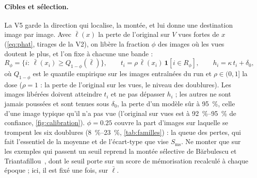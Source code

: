 \documentclass[11pt,a4paper]{article}
\begin{document}
\paragraph{Cibles et sélection.} La V5 garde la direction qui localise, la montée, et lui donne une
destination image par image. Avec $\bar\ell(x)$ la perte de l'original sur $V$ vues fortes de $x$
(\cref{eq:phat}, tirages de la V2), on libère la fraction $\phi$ des images où les vues doutent le
plus, et l'on fixe à chacune une bande :
\begin{equation}\label{eq:v5targets}
  R_\phi=\bigl\{i:\ \bar\ell(x_i)\ge Q_{1-\phi}(\bar\ell)\bigr\},\qquad
  t_i=\rho\,\bar\ell(x_i)\,\mathbf 1[i\in R_\phi],\qquad
  h_i=\kappa\,t_i+\delta_0,
\end{equation}
où $Q_{1-\phi}$ est le quantile empirique sur les images entraînées du run et $\rho\in(0,1]$ la dose
($\rho=1$ : la perte de l'original sur les vues, le niveau des doublures). Les images libérées doivent
atteindre $t_i$ et ne pas dépasser $h_i$ ; les autres ne sont jamais poussées et sont tenues sous
$\delta_0$, la perte d'un modèle sûr à \SI{95}{\percent}, celle d'une image typique qu'il n'a pas vue
(l'original sur vues est à \SIrange{92}{95}{\percent} de confiance, \cref{fig:calibration}).
$\phi=\num{0.25}$ couvre la part d'images sur laquelle se trompent les six doublures
(\SIrange{8}{23}{\percent}, \cref{tab:familles}) : la queue des pertes, qui fait l'essentiel de la
moyenne et de l'écart-type que vise $S_{\text{ms}}$. Ne monter que sur les exemples qui passent un
seuil reprend la montée sélective de Bărbulescu et Triantafillou~\cite{barbulescu2024each}, dont le
seuil porte sur un score de mémorisation recalculé à chaque époque ; ici, il est fixé une fois, sur
$\bar\ell$.
\end{document}
